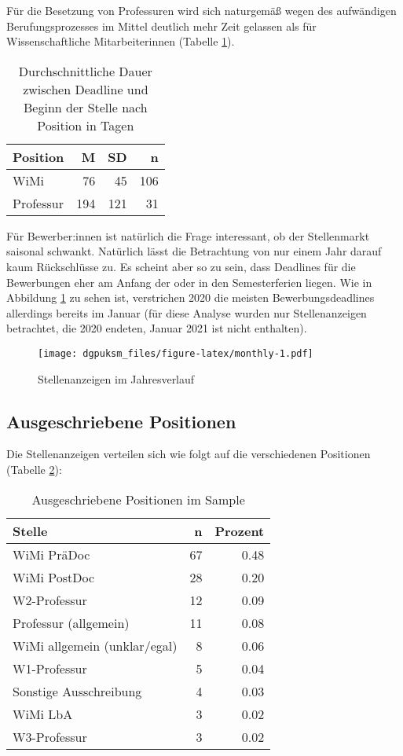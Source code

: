 \documentclass[
]{article}
\begin{document}
Für die Besetzung von Professuren wird sich naturgemäß wegen des aufwändigen Berufungsprozesses im Mittel deutlich mehr Zeit gelassen als für Wissenschaftliche Mitarbeiterinnen (Tabelle \ref{tab:timeperposition}).

\begin{table}[H]

\caption{\label{tab:timeperposition}Durchschnittliche Dauer zwischen Deadline und Beginn der Stelle nach Position in Tagen}
\centering
\begin{tabular}[t]{l|r|r|r}
\hline
Position & M & SD & n\\
\hline
WiMi & 76 & 45 & 106\\
\hline
Professur & 194 & 121 & 31\\
\hline
\end{tabular}
\end{table}

Für Bewerber:innen ist natürlich die Frage interessant, ob der Stellenmarkt saisonal schwankt. Natürlich lässt die Betrachtung von nur einem Jahr darauf kaum Rückschlüsse zu. Es scheint aber so zu sein, dass Deadlines für die Bewerbungen eher am Anfang der oder in den Semesterferien liegen. Wie in Abbildung \ref{fig:monthly} zu sehen ist, verstrichen 2020 die meisten Bewerbungsdeadlines allerdings bereits im Januar (für diese Analyse wurden nur Stellenanzeigen betrachtet, die 2020 endeten, Januar 2021 ist nicht enthalten).

\begin{figure}
\centering
\texttt{[image: dgpuksm\_files/figure-latex/monthly-1.pdf]}
\caption{\label{fig:monthly}Stellenanzeigen im Jahresverlauf}
\end{figure}

\hypertarget{ausgeschriebene-positionen}{%
\subsection{Ausgeschriebene Positionen}\label{ausgeschriebene-positionen}}

Die Stellenanzeigen verteilen sich wie folgt auf die verschiedenen Positionen (Tabelle \ref{tab:position}):

\begin{table}

\caption{\label{tab:position}Ausgeschriebene Positionen im Sample}
\centering
\begin{tabular}[t]{l|r|r}
\hline
Stelle & n & Prozent\\
\hline
WiMi PräDoc & 67 & 0.48\\
\hline
WiMi PostDoc & 28 & 0.20\\
\hline
W2-Professur & 12 & 0.09\\
\hline
Professur (allgemein) & 11 & 0.08\\
\hline
WiMi allgemein (unklar/egal) & 8 & 0.06\\
\hline
W1-Professur & 5 & 0.04\\
\hline
Sonstige Ausschreibung & 4 & 0.03\\
\hline
WiMi LbA & 3 & 0.02\\
\hline
W3-Professur & 3 & 0.02\\
\hline
\end{tabular}
\end{table}
\end{document}
